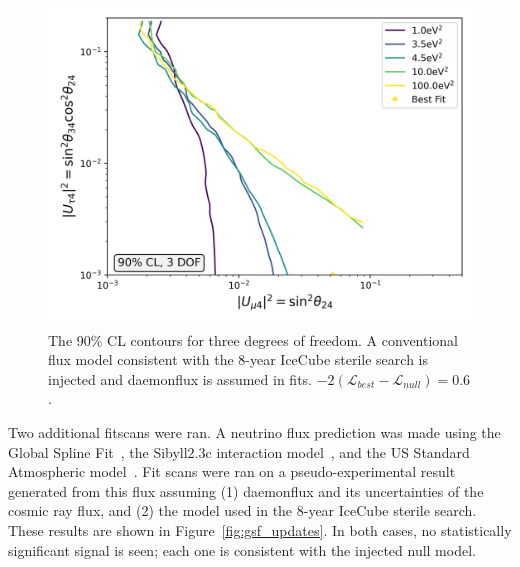 \documentclass[main.tex]{subfiles}
\begin{document}
\begin{figure}  
    \centering
    \includegraphics[width=0.7\linewidth]{figures/joint_daemon_inject_barr_Realization_Asimov_sterile_0_cl0.9_dof3.png}
    \caption{The 90\% CL contours for three degrees of freedom. A conventional flux model consistent with the 8-year IceCube sterile search is injected and daemonflux is assumed in fits. $-2(\mathcal{L}_{best}-\mathcal{L}_{null})=0.6$.}\label{fig:daemon_midmodel}
\end{figure}

Two additional fitscans were ran. 
A neutrino flux prediction was made using the Global Spline Fit~\cite{dembinski2017datadriven}, the Sibyll2.3c interaction model~\cite{Riehn:2017mfm}, and the US Standard Atmospheric model~\cite{united1976u}. 
Fit scans were ran on a pseudo-experimental result generated from this flux assuming (1) daemonflux and its uncertainties of the cosmic ray flux, and (2) the model used in the 8-year IceCube sterile search. 
These results are shown in Figure~\ref{fig:gsf_updates}. 
In both cases, no statistically significant signal is seen; each one is consistent with the injected null model. 
\end{document}
